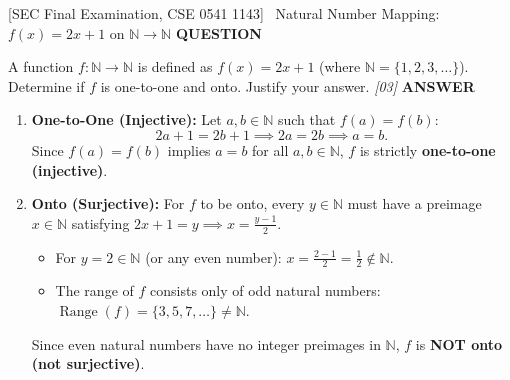 \documentclass[11pt,a4paper]{article}
\newcommand{\Qlabel}{\textbf{\color{navy}\footnotesize\MakeUppercase{Question}}\par\smallskip}
\newcommand{\Alabel}{\textbf{\color{teal}\footnotesize\MakeUppercase{Answer}}\par\smallskip}
\begin{document}
\begin{exambox}{[SEC Final Examination, CSE 0541 1143] \ Natural Number Mapping: $f(x) = 2x+1$ on $\mathbb{N}\to\mathbb{N}$}
\Qlabel
A function $f\colon \mathbb{N} \to \mathbb{N}$ is defined as $f(x) = 2x + 1$ (where $\mathbb{N} = \{1, 2, 3, \dots\}$). Determine if $f$ is one-to-one and onto. Justify your answer. \hfill\textit{[03]}
\tcblower
\Alabel
\begin{enumerate}
    \item \textbf{One-to-One (Injective):}
    Let $a, b \in \mathbb{N}$ such that $f(a) = f(b)$:
    \[
    2a + 1 = 2b + 1 \implies 2a = 2b \implies a = b.
    \]
    Since $f(a) = f(b)$ implies $a = b$ for all $a, b \in \mathbb{N}$, $f$ is strictly \textbf{one-to-one (injective)}.
    
    \item \textbf{Onto (Surjective):}
    For $f$ to be onto, every $y \in \mathbb{N}$ must have a preimage $x \in \mathbb{N}$ satisfying $2x + 1 = y \implies x = \frac{y - 1}{2}$.
    \begin{itemize}
        \item For $y = 2 \in \mathbb{N}$ (or any even number): $x = \frac{2 - 1}{2} = \frac{1}{2} \notin \mathbb{N}$.
        \item The range of $f$ consists only of odd natural numbers: $\operatorname{Range}(f) = \{3, 5, 7, \dots\} \neq \mathbb{N}$.
    \end{itemize}
    Since even natural numbers have no integer preimages in $\mathbb{N}$, $f$ is \textbf{NOT onto (not surjective)}.
\end{enumerate}
\end{exambox}
\end{document}
